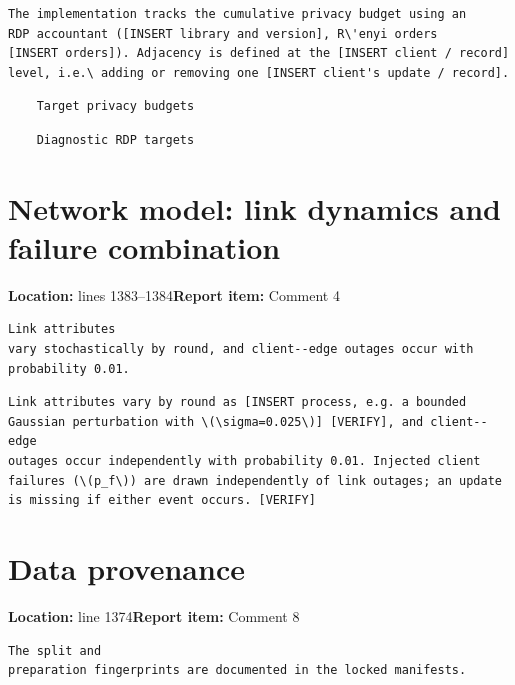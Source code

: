 \documentclass[10pt,a4paper]{article}
\newcommand{\issue}[3]{\section{#1}{\raggedright\noindent\textcolor{note}{\small\textbf{Location:} #2\quad\textbf{Report item:} #3}\par}\smallskip}
\begin{document}
\begin{after}
\begin{Verbatim}
The implementation tracks the cumulative privacy budget using an
RDP accountant ([INSERT library and version], R\'enyi orders
[INSERT orders]). Adjacency is defined at the [INSERT client / record]
level, i.e.\ adding or removing one [INSERT client's update / record].
\end{Verbatim}
\end{after}

\begin{before}
\begin{Verbatim}
	Target privacy budgets
\end{Verbatim}
\end{before}

\begin{after}
\begin{Verbatim}
	Diagnostic RDP targets
\end{Verbatim}
\end{after}

\issue{Network model: link dynamics and failure combination}{lines 1383--1384}{Comment 4}

\begin{before}[lines 1382--1384]
\begin{Verbatim}
Link attributes
vary stochastically by round, and client--edge outages occur with
probability 0.01.
\end{Verbatim}
\end{before}

\begin{after}
\begin{Verbatim}
Link attributes vary by round as [INSERT process, e.g. a bounded
Gaussian perturbation with \(\sigma=0.025\)] [VERIFY], and client--edge
outages occur independently with probability 0.01. Injected client
failures (\(p_f\)) are drawn independently of link outages; an update
is missing if either event occurs. [VERIFY]
\end{Verbatim}
\end{after}

\issue{Data provenance}{line 1374}{Comment 8}

\begin{before}[lines 1373--1374]
\begin{Verbatim}
The split and
preparation fingerprints are documented in the locked manifests.
\end{Verbatim}
\end{before}
\end{document}
